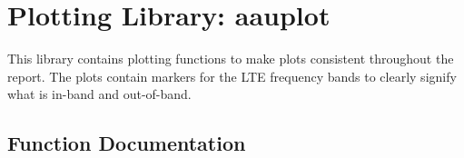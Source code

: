 \section{Plotting Library: aauplot}
\label{sec:satimolib}

This library contains plotting functions to make plots consistent throughout the report. The plots contain markers for the LTE frequency bands to clearly signify what is in-band and out-of-band.

\subsection{Function Documentation}

